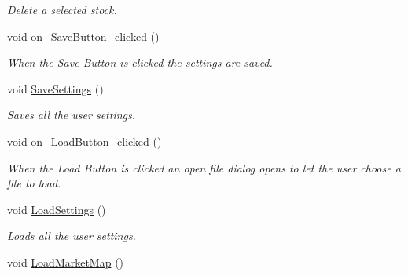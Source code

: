 \begin{DoxyCompactItemize}
\begin{DoxyCompactList}\small\item\em Delete a selected stock. \end{DoxyCompactList}\item 
\hypertarget{class_t_k_r_t_a_p_a091ace4c0a198698e146d5e4186adb88}{void \hyperlink{class_t_k_r_t_a_p_a091ace4c0a198698e146d5e4186adb88}{on\+\_\+\+Save\+Button\+\_\+clicked} ()}\label{class_t_k_r_t_a_p_a091ace4c0a198698e146d5e4186adb88}

\begin{DoxyCompactList}\small\item\em When the Save Button is clicked the settings are saved. \end{DoxyCompactList}\item 
\hypertarget{class_t_k_r_t_a_p_a3f0d2df000debf0e3d762cd42309ddd1}{void \hyperlink{class_t_k_r_t_a_p_a3f0d2df000debf0e3d762cd42309ddd1}{Save\+Settings} ()}\label{class_t_k_r_t_a_p_a3f0d2df000debf0e3d762cd42309ddd1}

\begin{DoxyCompactList}\small\item\em Saves all the user settings. \end{DoxyCompactList}\item 
\hypertarget{class_t_k_r_t_a_p_a2c5ded6487aad0d51e3c023d597b6072}{void \hyperlink{class_t_k_r_t_a_p_a2c5ded6487aad0d51e3c023d597b6072}{on\+\_\+\+Load\+Button\+\_\+clicked} ()}\label{class_t_k_r_t_a_p_a2c5ded6487aad0d51e3c023d597b6072}

\begin{DoxyCompactList}\small\item\em When the Load Button is clicked an open file dialog opens to let the user choose a file to load. \end{DoxyCompactList}\item 
\hypertarget{class_t_k_r_t_a_p_a15cd045fcc12644e07291ef00c9bc6f5}{void \hyperlink{class_t_k_r_t_a_p_a15cd045fcc12644e07291ef00c9bc6f5}{Load\+Settings} ()}\label{class_t_k_r_t_a_p_a15cd045fcc12644e07291ef00c9bc6f5}

\begin{DoxyCompactList}\small\item\em Loads all the user settings. \end{DoxyCompactList}\item 
\hypertarget{class_t_k_r_t_a_p_a5978ee276d97cfbdac62aa6a825d4449}{void \hyperlink{class_t_k_r_t_a_p_a5978ee276d97cfbdac62aa6a825d4449}{Load\+Market\+Map} ()}\label{class_t_k_r_t_a_p_a5978ee276d97cfbdac62aa6a825d4449}


\end{DoxyCompactItemize}
